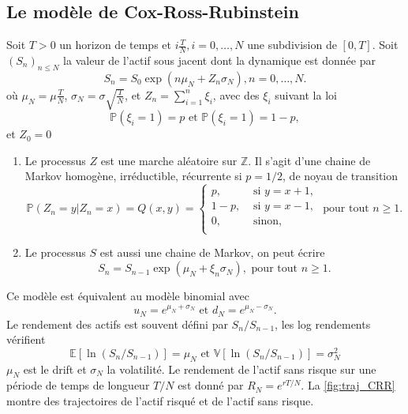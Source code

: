 \subsection{Le modèle de Cox-Ross-Rubinstein}
Soit $T>0$ un horizon de temps et $i\frac{T}{N}, i = 0,\ldots,N$ une subdivision de $[0, T]$. Soit $(S_n)_{n\leq N}$ la valeur de l'actif sous jacent dont la dynamique est donnée par 
$$
S_n = S_0\exp(n\mu_N + Z_n\sigma_N), n = 0,\ldots, N. 
$$
où $\mu_N = \mu\frac{T}{N}$, $\sigma_N = \sigma\sqrt{\frac{T}{N}}$, et $Z_n = \sum_{i = 1}^n\xi_i$, avec des $\xi_i$ \iid suivant la loi
$$
\mathbb{P}(\xi_i=1) = p\text{ et }\mathbb{P}(\xi_i=1) = 1-p,
$$
et $Z_0 = 0$
\begin{remark}
\begin{enumerate}
    \item Le processus $Z$ est une marche aléatoire sur $\mathbb{Z}$. Il s'agit d'une chaine de Markov homogène,  irréductible, récurrente si $p = 1/2$, de noyau de transition
    $$
    \mathbb{P}(Z_{n} = y|Z_{n} = x) = Q(x,y) = \begin{cases}
    p, &\text{ si }y = x+1, \\
    1 - p,&\text{ si }y = x-1, \\
    0, &\text{ sinon, }\\
    \end{cases}\text{ pour tout }n\geq1.
    $$ 
    \item  Le processus $S$ est aussi une chaine de Markov, on peut écrire 
    $$
    S_n = S_{n-1}\exp(\mu_N + \xi_{n}\sigma_N),\text{ pour tout }n\geq1.
    $$
\end{enumerate}

\end{remark}
Ce modèle est équivalent au modèle binomial avec
$$
u_N = e^{\mu_N + \sigma_N}\text{ et }d_N = e^{\mu_N - \sigma_N}.
$$
Le rendement des actifs est souvent défini par $S_n / S_{n-1}$, les log rendements vérifient 
$$
\mathbb{E}[\ln(S_n / S_{n-1})] = \mu_N\text{ et }\mathbb{V}[\ln(S_n / S_{n-1})] = \sigma_N^2
$$
$\mu_N$ est le drift et $\sigma_N$ la volatilité. Le rendement de l'actif sans risque sur une période de temps de longueur $T/N$ est donné par $R_N = e^{rT/N}$. La \cref{fig:traj_CRR} montre des trajectoires de l'actif risqué et de l'actif sans risque.
